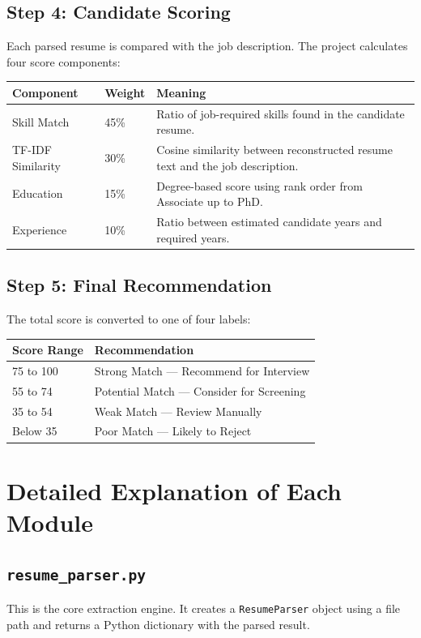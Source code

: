 \documentclass[12pt,a4paper]{article}
\begin{document}
\subsection{Step 4: Candidate Scoring}
Each parsed resume is compared with the job description. The project calculates four score components:

\begin{longtable}{p{4cm}p{2.5cm}p{8cm}}
\toprule
\textbf{Component} & \textbf{Weight} & \textbf{Meaning} \\
\midrule
Skill Match & 45\% & Ratio of job-required skills found in the candidate resume. \\
TF-IDF Similarity & 30\% & Cosine similarity between reconstructed resume text and the job description. \\
Education & 15\% & Degree-based score using rank order from Associate up to PhD. \\
Experience & 10\% & Ratio between estimated candidate years and required years. \\
\bottomrule
\end{longtable}

\subsection{Step 5: Final Recommendation}
The total score is converted to one of four labels:

\begin{longtable}{p{3cm}p{10cm}}
\toprule
\textbf{Score Range} & \textbf{Recommendation} \\
\midrule
75 to 100 & Strong Match --- Recommend for Interview \\
55 to 74 & Potential Match --- Consider for Screening \\
35 to 54 & Weak Match --- Review Manually \\
Below 35 & Poor Match --- Likely to Reject \\
\bottomrule
\end{longtable}

\section{Detailed Explanation of Each Module}
\subsection{\texttt{resume\_parser.py}}
This is the core extraction engine. It creates a \texttt{ResumeParser} object using a file path and returns a Python dictionary with the parsed result.
\end{document}
